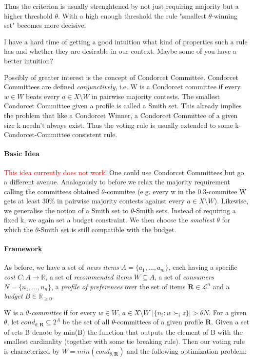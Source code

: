 \documentclass[10pt,a4paper]{article}
\begin{document}
Thus the criterion is usually strenghtened by not just requiring majority but a higher threshold $\theta$. With a high enough threshold the rule
"smallest $\theta$-winning set" becomes more decisive.

I have a hard time of getting a good intuition what kind of properties such a rule has and whether they are desirable in our context. Maybe some
of you have a better intuition?

Possibly of greater interest is the concept of Condorcet Committee. Condorcet Committees are defined \emph{conjunctively}, i.e. W is a Condorcet
committee if every $w\in W$ beats every $a\in X\setminus W$ in pairwise majority contests. The smallest Condorcet Committee given a profile is
called a Smith set. This already implies the problem that like a Condorcet Winner, a Condorcet Committee of a given size k needn't always exist.
Thus the voting rule is usually extended to some k-Condorcet-Committee consistent rule.

\paragraph{Basic Idea}

\textcolor{red}{This idea currently does not work!} One could use Condorcet Committees but go a different avenue.
Analogously to before,we relax the majority requirement calling the committees obtained $\theta$-commitee (e.g. every w
in the $0.3$-commitee W gets at least 30\% in pairwise majority contests against every $a\in X\setminus W$). Likewise, we
generalise the notion of a Smith set to $\theta$-Smith sets. Instead of requiring a fixed k, we again set a budget
constraint. We then choose the \emph{smallest} $\theta$ for which the $\theta$-Smith set is still compatible with the
budget.

\paragraph{Framework}

As before, we have a set of \emph{news items} $A=\{a_1,...,a_m\}$, each having a specific \emph{cost} $C:
A\rightarrow \mathbb{R}$, a set of \emph{recommended items} $W\subseteq A$, a set of \emph{consumers} $N=\{n_1,...,
n_n\}$, a \emph{profile of preferences} over the set of items $\mathbf{R}\in \mathcal{L}^n$ and a \emph{budget}
$B\in \mathbb{R}_{\geq 0}$.

W is a \emph{$\theta$-committee} if for every $w\in W$, $a\in X\setminus W$ $|\{n_i:w\succ_i z\}|>\theta N$. For a
given $\theta$, let $cond_{\theta,\mathbf{R}}\subseteq 2^A$ be the set of all $\theta$-committees of a given
profile $\mathbf{R}$. Given a set of sets B denote by min(B) the function that outputs the element of B with the
smallest cardinality (together with some tie breaking rule). Then our voting rule is characterized by $W=min
(cond_{\theta,\mathbf{R}})$ and the following optimization problem:
\end{document}
